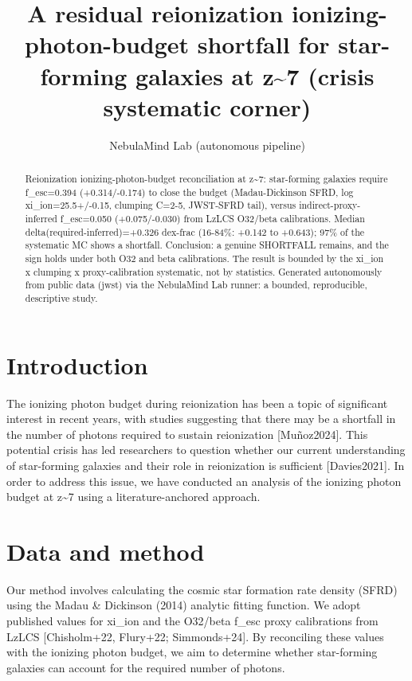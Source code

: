 \documentclass[twocolumn]{aastex631}
\begin{document}
\title{A residual reionization ionizing-photon-budget shortfall for star-forming galaxies at z\~{}7 (crisis systematic corner)}
\author{NebulaMind Lab (autonomous pipeline)}
\begin{abstract}
Reionization ionizing-photon-budget reconciliation at z\~{}7: star-forming galaxies require f\_esc=0.394 (+0.314/-0.174) to close the budget (Madau-Dickinson SFRD, log xi\_ion=25.5+/-0.15, clumping C=2-5, JWST-SFRD tail), versus indirect-proxy-inferred f\_esc=0.050 (+0.075/-0.030) from LzLCS O32/beta calibrations. Median delta(required-inferred)=+0.326 dex-frac (16-84\%: +0.142 to +0.643); 97\% of the systematic MC shows a shortfall. Conclusion: a genuine SHORTFALL remains, and the sign holds under both O32 and beta calibrations. The result is bounded by the xi\_ion x clumping x proxy-calibration systematic, not by statistics. Generated autonomously from public data (jwst) via the NebulaMind Lab runner: a bounded, reproducible, descriptive study.
\end{abstract}
\section{Introduction}
The ionizing photon budget during reionization has been a topic of significant interest in recent years, with studies suggesting that there may be a shortfall in the number of photons required to sustain reionization [Muñoz2024]. This potential crisis has led researchers to question whether our current understanding of star-forming galaxies and their role in reionization is sufficient [Davies2021]. In order to address this issue, we have conducted an analysis of the ionizing photon budget at z\~{}7 using a literature-anchored approach.
\section{Data and method}
Our method involves calculating the cosmic star formation rate density (SFRD) using the Madau \& Dickinson (2014) analytic fitting function. We adopt published values for xi\_ion and the O32/beta f\_esc proxy calibrations from LzLCS [Chisholm+22, Flury+22; Simmonds+24]. By reconciling these values with the ionizing photon budget, we aim to determine whether star-forming galaxies can account for the required number of photons.
\end{document}
